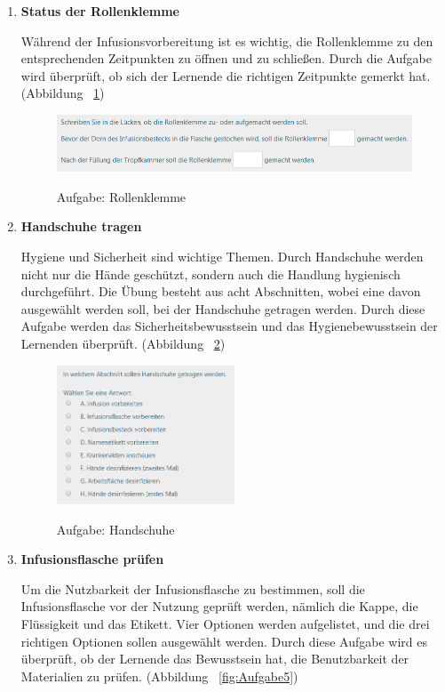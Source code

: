 \begin{enumerate}
    \item \textbf{Status der Rollenklemme}
    
    Während der Infusionsvorbereitung ist es wichtig, die Rollenklemme zu den entsprechenden Zeitpunkten zu öffnen und zu schließen. Durch die Aufgabe wird überprüft, ob sich der Lernende die richtigen Zeitpunkte gemerkt hat. (Abbildung ~\ref{fig:Aufgabe3})
    
\begin{figure}[ht]
\vspace*{1em}
\centering
\caption{Aufgabe: Rollenklemme}
\includegraphics[width= \textwidth]{images/Aufgabe3.png}
\label{fig:Aufgabe3} 
\end{figure}
    
    \item \textbf{Handschuhe tragen}
    
    
    Hygiene und Sicherheit sind wichtige Themen. Durch Handschuhe werden nicht nur die Hände geschützt, sondern auch die Handlung hygienisch durchgeführt. Die Übung besteht aus acht Abschnitten, wobei eine davon ausgewählt werden soll, bei der  Handschuhe getragen werden. Durch diese Aufgabe werden das Sicherheitsbewusstsein und das Hygienebewusstsein der Lernenden überprüft. (Abbildung ~\ref{fig:Aufgabe4})
    
\begin{figure}[ht]
\vspace*{1em}
\centering
\caption{Aufgabe: Handschuhe}
\includegraphics[width= 0.5\textwidth]{images/Aufgabe4.png}
\label{fig:Aufgabe4} 
\end{figure}
    
    \item \textbf{Infusionsflasche prüfen}
    
    Um die Nutzbarkeit der Infusionsflasche zu bestimmen, soll die Infusionsflasche vor der Nutzung geprüft werden, nämlich die Kappe, die Flüssigkeit und das Etikett. Vier Optionen werden aufgelistet, und die drei richtigen Optionen sollen ausgewählt werden. Durch diese Aufgabe wird es überprüft, ob der Lernende das Bewusstsein hat, die Benutzbarkeit der Materialien zu prüfen. (Abbildung ~\ref{fig:Aufgabe5})
    

\end{enumerate}
